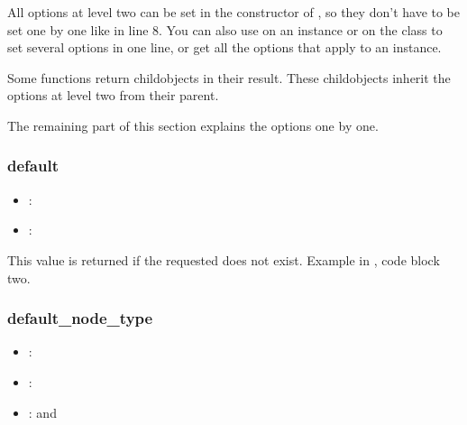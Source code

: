 \documentclass[a4paper,10pt,english]{sphinxmanual}
\begin{document}
\sphinxAtStartPar
All \sphinxhyphen{}options at level two can be set in the constructor of , so they don’t have to be set one by one like in line 8. You can also use  on an instance or on the \sphinxhyphen{}class to set several options in one line, or get all the options that apply to an instance.

\sphinxAtStartPar
Some \sphinxhyphen{}functions return child\sphinxhyphen{}\sphinxhyphen{}objects in their result. These child\sphinxhyphen{}objects inherit the options at level two from their parent.

\sphinxAtStartPar
The remaining part of this section explains the options one by one.


\subsubsection{default}
\label{\detokenize{README:default}}\begin{itemize}
\item {}
\sphinxAtStartPar
{}: 

\item {}
\sphinxAtStartPar
{}: 

\end{itemize}

\sphinxAtStartPar
This value is returned if the requested {\hyperref[\detokenize{README:the-path-parameter}]{}} does not exist. Example in {\hyperref[\detokenize{README:introduction-what-it-solves}]{}}, code block two.


\subsubsection{default\_node\_type}
\label{\detokenize{README:default-node-type}}\begin{itemize}
\item {}
\sphinxAtStartPar
{}: 

\item {}
\sphinxAtStartPar
{}: 

\item {}
\sphinxAtStartPar
{}:  and 

\end{itemize}
\end{document}
